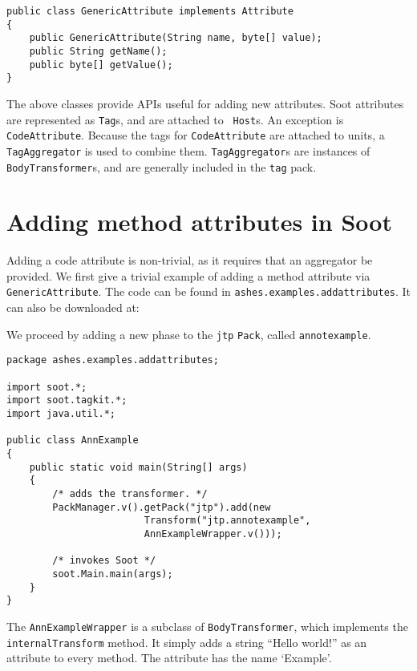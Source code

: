 \documentclass{article}
\begin{document}
\begin{description}
\begin{verbatim}
public class GenericAttribute implements Attribute
{
    public GenericAttribute(String name, byte[] value);
    public String getName();
    public byte[] getValue();
}    
\end{verbatim}
\end{description}
     
The above classes provide APIs useful for adding new attributes. Soot
attributes are represented as {\tt Tag}s, and are attached to {\tt
Host}s.  An exception is {\tt CodeAttribute}. Because the tags for
{\tt CodeAttribute} are attached to units, a {\tt TagAggregator} is used to
combine them. {\tt TagAggregator}s are instances of {\tt BodyTransformer}s,
and are generally included in the {\tt tag} pack.

\section{Adding method attributes in Soot}
Adding a code attribute is non-trivial, as it requires that an aggregator
be provided.  We first give a trivial example of adding a method attribute
via {\tt GenericAttribute}. The code can be found in {\tt ashes.examples.addattributes}.
It can also be downloaded at:


We proceed by adding a new phase to the {\tt jtp} {\tt Pack}, called
{\tt annotexample}.

\begin{verbatim}
package ashes.examples.addattributes;

import soot.*;
import soot.tagkit.*;
import java.util.*;

public class AnnExample
{
    public static void main(String[] args)
    {
        /* adds the transformer. */
        PackManager.v().getPack("jtp").add(new
                        Transform("jtp.annotexample",
                        AnnExampleWrapper.v()));

        /* invokes Soot */
        soot.Main.main(args);
    }
}
\end{verbatim}

The {\tt AnnExampleWrapper} is a subclass of {\tt BodyTransformer},
which implements the {\tt internalTransform} method. It simply
adds a string ``Hello world!'' as an attribute to every method.
The attribute has the name `Example'.
\end{document}
